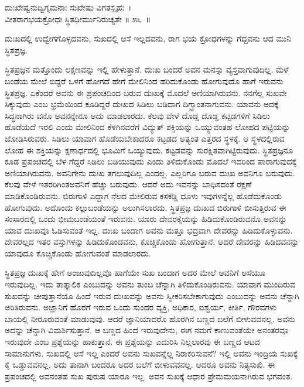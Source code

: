 \begin{shloka}
ದುಃಖೇಷ್ವನುದ್ವಿಗ್ನಮನಾಃ ಸುಖೇಷು ವಿಗತಸ್ಪೃಹಃ~।\\ವೀತರಾಗಭಯಕ್ರೋಧಃ ಸ್ಥಿತಧೀರ್ಮುನಿರುಚ್ಯತೇ \hfill॥ ೫೬~॥
\end{shloka}

\begin{artha}
ದುಃಖದಲ್ಲಿ ಉದ್ವೇಗಗೊಳ್ಳದವನು, ಸುಖದಲ್ಲಿ ಆಸೆ ಇಲ್ಲದವನು, ರಾಗ ಭಯ ಕ್ರೋಧಗಳನ್ನು ಗೆದ್ದವನು ಆದ ಮುನಿ ಸ್ಥಿತಪ್ರಜ್ಞ.
\end{artha}

ಸ್ಥಿತಪ್ರಜ್ಞನ ಮತ್ತೊಂದು ಲಕ್ಷಣವನ್ನು ಇಲ್ಲಿ ಹೇಳುತ್ತಾನೆ. ದುಃಖ ಬಂದರೆ ಅವನ ಮನಸ್ಸು ವ್ಯಸ್ತವಾಗುವುದಿಲ್ಲ. ಮಳೆ ಬಂಡೆಯ ಮೇಲೆ ಬಿದ್ದರೆ ಒಳಗೆ ಹೋಗದೆ ಹೇಗೆ ಮೇಲಿನಿಂದ ಹರಿದುಕೊಂಡು ಹೋಗುವುದೊ ಹಾಗೆ ಇರುವನು ಸ್ಥಿತಪ್ರಜ್ಞ. ಏಕೆಂದರೆ ಅವನು ಈ ಪ್ರಪಂಚದಿಂದ ಬರುವ ದುಃಖಕ್ಕೆ ಮೊದಲೆ ಅಣಿಯಾಗಿರುವನು. ನನಗೆಲ್ಲ ಸುಖವೇ ಸಿಕ್ಕುವುದು ಎಂಬ ಭ್ರಮೆಯಿಂದ ಕೂಡಿದ್ದರೆ ದುಃಖದ ಸಿಡಿಲು ಬಡಿದಾಗ ದಿಗ್ಭ್ರಾಂತನಾಗುವನು. ಯಾವನು ಅದಕ್ಕೆ ಸಿದ್ಧನಾಗಿರು ವನೊ ಅವನನ್ನೇನೂ ಅದು ಮಾಡಲಾರದು. ಕೆಲವು ವೇಳೆ ದೊಡ್ಡ ದೊಡ್ಡ ಕಟ್ಟಡಗಳಿಗೆ ಸಿಡಿಲು ಹೊಡೆಯದೆ ಇರಲಿ ಎಂದು ಮೇಲಿನಿಂದ ಕೆಳಗಿನವರೆಗೆ ವಿದ್ಯುತ್ ಶಕ್ತಿಯನ್ನು ಒಯ್ಯುವಂತಹ ಲೋಹದ ಪಟ್ಟಿಯನ್ನು ಜೋಡಿಸಿರುವರು. ಸಿಡಿಲು ಯಾವಾಗ ಹೊಡೆಯಬೇಕಾದರೂ ಕಟ್ಟಡದ ಅತ್ಯಂತ ಎತ್ತರದ ಸ್ಥಳಕ್ಕೆ. ಆ ಸ್ಥಳದಲ್ಲಿರುವ ಲೋಹ ಈ ಶಕ್ತಿಯನ್ನು ಕ್ಷಣಾರ್ಧದಲ್ಲಿ ಭೂಮಿಗೆ ಒಯ್ಯುವುದು, ಕಟ್ಟಡವನ್ನು ಸುರಕ್ಷಿತವಾಗಿಟ್ಟಿರುವುದು. ಸ್ಥಿತಪ್ರಜ್ಞನೂ ಕೂಡ ಪ್ರಪಂಚದಲ್ಲಿ ಬೆಳ ಗೆದ್ದರೆ ಸಿಡಿಲು ಬಡಿಯುವುದು ಎಂದು ತಿಳಿದುಕೊಂಡು ಮೊದಲೆ ಇದರಿಂದ ಪಾರಾಗುವುದಕ್ಕೆ ಅಣಿಯಾಗಿರುವನು. ಅವನಿಗೇನು ದುಃಖ ತಗಲುವುದಿಲ್ಲ ಎಂದಲ್ಲ. ಎಲ್ಲರಿಗೂ ಬರುವ ದುಃಖ ಅವನಿಗೂ ಬರುವುದು. ಕೆಲವು ವೇಳೆ ಇತರರಿಗಿಂತ\break ಅವನಿಗೆ ಹೆಚ್ಚು ಬರುವುದು. ಆದರೆ ಅದು ಇವನನ್ನು ಬಾಧಿಸದಂತೆ ರಕ್ಷಣೆ ಮಾಡಿಕೊಂಡಿರುವನು. ಬಿರುಗಾಳಿ ಎದ್ದಾಗ ನೆಲದ ಮೇಲಿರುವ ಕಸಕಡ್ಡಿ ಧೂಳು ಇವುಗಳನ್ನೆಲ್ಲ ಹೊಡೆದುಕೊಂಡು ಹೋಗುವುದು. ಅದೊಂದು ಕಲ್ಲುಬಂಡೆಯನ್ನು ಅಲುಗಿಸಲಾರದು. ಸ್ಥಿತಪ್ರಜ್ಞ ದುಃಖದ ಬಿರುಗಾಳಿ ಬೀಸುತ್ತಿರುವ ಈ ಸಂಸಾರದಲ್ಲಿ ಒಂದು ಭೀಮಬಂಡೆಯಂತೆ ಇರುವನು. ಯಾರು ದೇವರ\break ಕೈಯನ್ನು ಹಿಡಿದುಕೊಂಡಿರುವನೊ ಅವನನ್ನು ಯಾವ ದುಃಖವೂ ಓಡಿಸುವಂತೆ ಇಲ್ಲ. ದುಃಖ ಬಂದಾಗ ಅವನು ಮತ್ತೂ ಭದ್ರವಾಗಿ ದೇವರನ್ನು ಹಿಡಿದುಕೊಳ್ಳುವನು. ದೇವರಲ್ಲದ ಇತರ ವಸ್ತುಗಳನ್ನು ಹಿಡಿದುಕೊಂಡವನು, ಕೊಚ್ಚಿಕೊಂಡು ಹೋಗುತ್ತಾನೆ. ಆದರೆ ದೇವರನ್ನು ಹಿಡಿದವನನ್ನು ಯಾವುದೂ ಕೊಚ್ಚಿಕೊಂಡು ಹೋಗುವಂತೆ ಮಾಡಲಾರದು.

ಸ್ಥಿತಪ್ರಜ್ಞ ದುಃಖಕ್ಕೆ ಹೇಗೆ ಅಂಜುವುದಿಲ್ಲವೊ ಹಾಗೆಯೇ ಸುಖ ಬಂದಾಗ ಅದರ ಮೇಲೆ ಅವನಿಗೆ ಆಸೆಯೂ ಇರುವುದಿಲ್ಲ. ಇದು ತಾತ್ಕಾಲಿಕ ಎಂಬುದನ್ನು ಅವನು ತುಂಬ ಚೆನ್ನಾಗಿ ತಿಳಿದುಕೊಂಡಿರುವನು. ಯಾವಾಗ ಮುಂದಿರುವ ಸುಖವನ್ನು ಚೀಪುತ್ತಾನೆಯೊ ಹಿಂದೆ ಇರುವ ದುಃಖವನ್ನು ಅವನು ಸ್ವೀಕರಿಸಬೇಕಾಗುವುದು ಎಂಬುದನ್ನು ಅವನು ಚೆನ್ನಾಗಿ ಅರಿತಿರುವನು. ಅಜ್ಞಾನಿಗೆ ಹೊರಗೆ ಇರುವ ಒಂದು ಸುಂದರ ವ್ಯಕ್ತಿ, ಅಧಿಕಾರ, ಐಶ್ವರ್ಯ, ಕೀರ್ತಿ, ಗೌರವಗಳು ಬಾಯಲ್ಲಿ ನೀರೂರುವಂತೆ ಮಾಡುವುವು. ಆದರೆ ಜ್ಞಾನಿಯಾದರೊ ಹೊರಗಿನ ಬಣ್ಣದ ಬಲೆಗೆ ಬೀಳುವವನಲ್ಲ. ಅವನು ಅದನ್ನು ಚೆನ್ನಾಗಿ ವಿಮರ್ಶಿಸುತ್ತಾನೆ. ಆ ಬಣ್ಣದ ಹಿಂದೆ ಇರುವುದೇನು, ಈಗ ನಮಗೆ ಕಾಣುವಂತೆಯೇ ಅನಂತರವೂ ಇರುವುದೇ ಎಂಬ ಪ್ರಶ್ನೆಯನ್ನು ಹಾಕುತ್ತಾನೆ. ಈ ಪ್ರಶ್ನೆಯನ್ನು ಎದುರಿಸಿ ನಿಲ್ಲಲಾರವು ಈ ಬಣ್ಣದ ಆಟದ ಸಾಮಾನುಗಳು. ಸುಖದಲ್ಲಿ ಆಸೆ ಇಲ್ಲ ಎಂದರೆ ಅವನು ಸುಖವನ್ನೆಲ್ಲ ನಿರಾಕರಿಸುವನೆ? ಇಲ್ಲಿ ಅವನು ಇಂದ್ರಿಯ ಸುಖಕ್ಕೆ ಕೈ ಒಡ್ಡುವವನಲ್ಲ. ಅದು ತಾನಾಗಿ ಬಂದರೂ ಅದರ ಬಲೆಗೆ ಬೀಳುವವನಲ್ಲ. ಆದರೂ ಅವನು ನಿತ್ಯಸುಖಿ. ಈ ಪ್ರಪಂಚದಲ್ಲಿ ಅವನಂತಹ ಸುಖ ಪುರುಷ ಯಾರೂ ಇಲ್ಲ. ಅವನ ಸುಖಕ್ಕೆ ಆಧಾರ ಪ್ರೇಮಮಯನಾಗಿರುವ ಭಗವಂತ.

